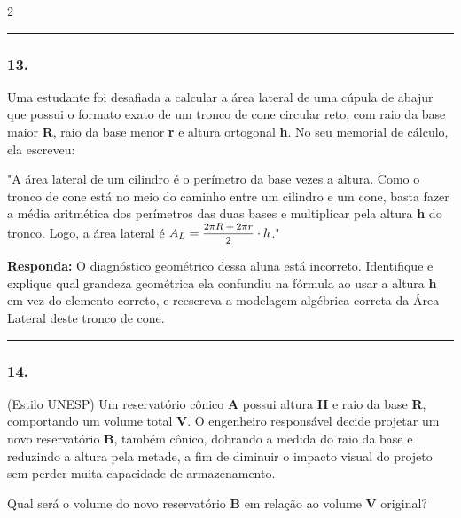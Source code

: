 \documentclass[twoside, 10pt, a4paper]{article}
\newlength{\espacoPreQuestao}\setlength{\espacoPreQuestao}{0.1cm}
\newlength{\espacoQuestao}\setlength{\espacoQuestao}{0.2cm}
\begin{document}
\begin{multicols*}{2}
\noindent\textcolor{CorLinha}{\rule{\linewidth}{0.5pt}}
\par\vspace{\espacoPreQuestao}
\subsubsection*{13.} Uma estudante foi desafiada a calcular a área lateral de uma cúpula de abajur que possui o formato exato de um tronco de cone circular reto, com raio da base maior \textbf{R}, raio da base menor \textbf{r} e altura ortogonal \textbf{h}. No seu memorial de cálculo, ela escreveu:

"A área lateral de um cilindro é o perímetro da base vezes a altura. Como o tronco de cone está no meio do caminho entre um cilindro e um cone, basta fazer a média aritmética dos perímetros das duas bases e multiplicar pela altura \textbf{h} do tronco. Logo, a área lateral é $ A_L = \mfrac{2\pi R + 2\pi r}{2} \cdot h $."

\begin{boxresponda}
\textbf{Responda:} O diagnóstico geométrico dessa aluna está incorreto. Identifique e explique qual grandeza geométrica ela confundiu na fórmula ao usar a altura \textbf{h} em vez do elemento correto, e reescreva a modelagem algébrica correta da Área Lateral deste tronco de cone.
\end{boxresponda}
\par\vspace{\espacoQuestao}

\noindent\textcolor{CorLinha}{\rule{\linewidth}{0.5pt}} 
\par\vspace{\espacoPreQuestao}
\subsubsection*{14.} (Estilo UNESP) Um reservatório cônico \textbf{A} possui altura \textbf{H} e raio da base \textbf{R}, comportando um volume total \textbf{V}. O engenheiro responsável decide projetar um novo reservatório \textbf{B}, também cônico, dobrando a medida do raio da base e reduzindo a altura pela metade, a fim de diminuir o impacto visual do projeto sem perder muita capacidade de armazenamento.

Qual será o volume do novo reservatório \textbf{B} em relação ao volume \textbf{V} original? 


\end{multicols*}
\end{document}
